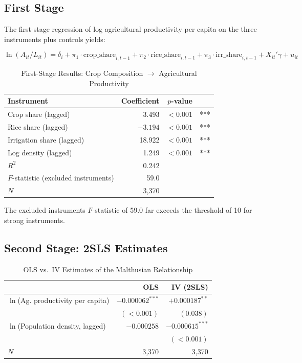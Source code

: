 \documentclass[12pt,letterpaper]{article}
\begin{document}
\subsection{First Stage}

The first-stage regression of log agricultural productivity per capita on the three instruments plus controls yields:

\begin{equation}
  \ln(A_{it}/L_{it}) = \delta_i + \pi_1 \cdot \text{crop\_share}_{i,t-1} + \pi_2 \cdot \text{rice\_share}_{i,t-1} + \pi_3 \cdot \text{irr\_share}_{i,t-1} + X_{it}'\gamma + u_{it}
\end{equation}

\begin{table}[H]
\centering
\caption{First-Stage Results: Crop Composition $\to$ Agricultural Productivity}
\label{tab:first_stage}
\small
\begin{tabular}{lrrl}
\toprule
Instrument & Coefficient & $p$-value & \\
\midrule
Crop share (lagged) & 3.493 & $<0.001$ & *** \\
Rice share (lagged) & $-3.194$ & $<0.001$ & *** \\
Irrigation share (lagged) & 18.922 & $<0.001$ & *** \\
Log density (lagged) & 1.249 & $<0.001$ & *** \\
\midrule
$R^2$ & 0.242 & & \\
$F$-statistic (excluded instruments) & 59.0 & & \\
$N$ & 3,370 & & \\
\bottomrule
\end{tabular}
\end{table}

The excluded instruments $F$-statistic of 59.0 far exceeds the \citet{stock2005testing} threshold of 10 for strong instruments.

\subsection{Second Stage: 2SLS Estimates}

\begin{table}[H]
\centering
\caption{OLS vs.\ IV Estimates of the Malthusian Relationship}
\label{tab:ols_vs_iv}
\small
\begin{tabular}{lrr}
\toprule
 & OLS & IV (2SLS) \\
\midrule
$\ln$(Ag. productivity per capita) & $-0.000062^{***}$ & $+0.000187^{**}$ \\
 & $(< 0.001)$ & $(0.038)$ \\
$\ln$(Population density, lagged) & $-0.000258$ & $-0.000615^{***}$ \\
 & & $(< 0.001)$ \\
$N$ & 3,370 & 3,370 \\
\bottomrule
\end{tabular}
\end{table}
\end{document}
